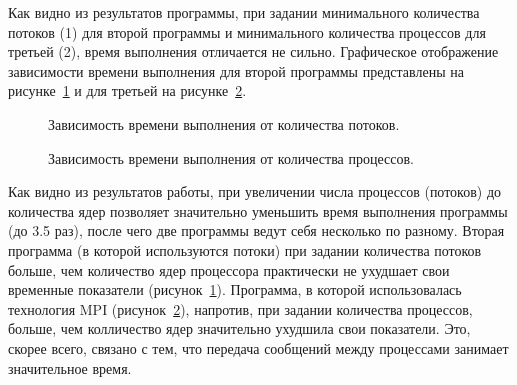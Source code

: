 \documentclass[12pt,a4paper]{report}
\begin{document}
				Как видно из результатов программы, при задании минимального количества 
				потоков (1) для второй программы и минимального количества процессов 
				для третьей (2), время выполнения отличается не сильно. Графическое 
				отображение зависимости времени выполнения для второй программы 
				представлены на рисунке~\ref{ris:threads} и для третьей на 
				рисунке~\ref{ris:mpi}.
				\begin{figure}[h]
					\caption{Зависимость времени выполнения от количества потоков.}
					\label{ris:threads}
				\end{figure}
				
				\begin{figure}[h]
					\caption{Зависимость времени выполнения от количества процессов.}
					\label{ris:mpi}
				\end{figure}
				
				Как видно из результатов работы, при увеличении числа процессов 
				(потоков) до количества ядер позволяет значительно уменьшить время 
				выполнения программы (до 3.5 раз), после чего две программы ведут себя 
				несколько по разному. Вторая программа (в которой используются потоки) 
				при задании количества потоков больше, чем количество ядер процессора 
				практически не ухудшает свои временные показатели 
				(рисунок~\ref{ris:threads}). Программа, в которой использовалась 
				технология MPI (рисунок~\ref{ris:mpi}), напротив, при задании 
				количества процессов, больше, чем колличество ядер значительно ухудшила 
				свои показатели. Это, скорее всего, связано с тем, что передача 
				сообщений между процессами занимает значительное время.
			
\end{document}
